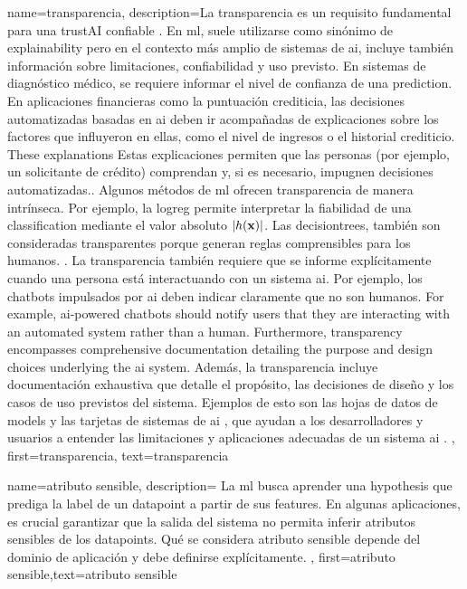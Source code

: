 {{
{name={transparencia},
	description={La transparencia es un requisito fundamental para una 
		\gls{trustAI} confiable \cite{HLEGTrustworhtyAI}. En \gls{ml},
		suele utilizarse como sinónimo de \gls{explainability} \cite{gallese2023ai,JunXML2020}
		pero en el contexto más amplio de sistemas de \gls{ai}, 
		incluye también información sobre limitaciones, confiabilidad y uso previsto. 
		En sistemas de diagnóstico médico, se requiere informar el nivel de confianza de una \gls{prediction}.
		En aplicaciones financieras como la puntuación crediticia, las decisiones automatizadas basadas en \gls{ai}
		deben ir acompañadas de explicaciones sobre los factores que influyeron en ellas, como el nivel de ingresos o el historial crediticio. These explanations 
		Estas explicaciones permiten que las personas (por ejemplo, un solicitante de crédito) comprendan y, 
		si es necesario, impugnen decisiones automatizadas.. 
		Algunos métodos de \gls{ml} ofrecen transparencia de manera intrínseca. Por ejemplo, la \gls{logreg} 
		permite interpretar la fiabilidad de una \gls{classification} mediante el valor absoluto $|h({\bf x})|$. 
		Las \gls{decisiontree}s,  también son consideradas transparentes porque generan reglas comprensibles para los humanos.
		\cite{rudin2019stop}.
		La transparencia también requiere que se informe explícitamente cuando una persona está interactuando con un sistema \gls{ai}.
		Por ejemplo, los chatbots impulsados por \gls{ai} deben indicar claramente que no son humanos. 
		For example, \gls{ai}-powered chatbots should notify users that they are interacting with an 
		automated system rather than a human. Furthermore, transparency encompasses comprehensive 
		documentation detailing the purpose and design choices underlying the \gls{ai} system. 
		Además, la transparencia incluye documentación exhaustiva que detalle el propósito, las decisiones de diseño y los casos de uso previstos del sistema.
		Ejemplos de esto son las hojas de datos de \gls{model}s \cite{DatasheetData2021}
		 y las tarjetas de sistemas de \gls{ai} \cite{10.1145/3287560.3287596}, 
		 que ayudan a los desarrolladores y usuarios a entender las limitaciones y aplicaciones adecuadas de un sistema \gls{ai} \cite{Shahriari2017}.
		 },
	first={transparencia}, text={transparencia} 
}



{
	name=atributo sensible,
	description={
		La \gls{ml} busca aprender una \gls{hypothesis} que prediga la \gls{label} de un \gls{datapoint} a partir de sus \gls{feature}s.
		En algunas aplicaciones, es crucial garantizar que la salida del sistema no permita inferir atributos sensibles de los \gls{datapoint}s.
		Qué se considera atributo sensible depende del dominio de aplicación y debe definirse explícitamente.
	},
	first={atributo sensible},text={atributo sensible}
}

}}
